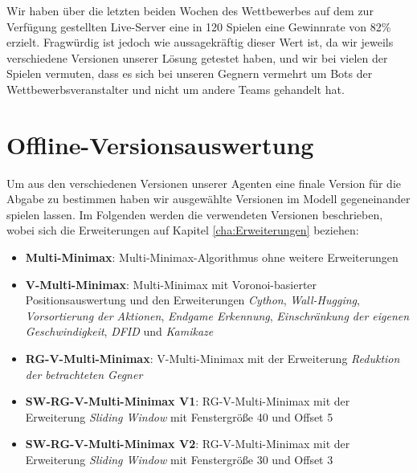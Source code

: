 Wir haben über die letzten beiden Wochen des Wettbewerbes auf dem zur Verfügung gestellten Live-Server eine in 120 Spielen eine Gewinnrate von 82\% erzielt. Fragwürdig ist jedoch wie aussagekräftig dieser Wert ist, da wir jeweils verschiedene Versionen unserer Lösung getestet haben, und wir bei vielen der Spielen vermuten, dass es sich bei unseren Gegnern vermehrt um Bots der Wettbewerbsveranstalter und nicht um andere Teams gehandelt hat.  


\section{Offline-Versionsauswertung}

Um aus den verschiedenen Versionen unserer Agenten eine finale Version für die Abgabe zu bestimmen haben wir ausgewählte Versionen im Modell gegeneinander spielen lassen. Im Folgenden werden die verwendeten Versionen beschrieben, wobei sich die Erweiterungen auf Kapitel \ref{cha:Erweiterungen} beziehen:
\begin{itemize}
    \item \textbf{Multi-Minimax}: Multi-Minimax-Algorithmus \cite{Perez.2019} ohne weitere Erweiterungen
    \item \textbf{V-Multi-Minimax}: Multi-Minimax mit Voronoi-basierter Positionsauswertung und den Erweiterungen \textit{Cython}, \textit{Wall-Hugging}, \textit{Vorsortierung der Aktionen}, \textit{Endgame Erkennung}, \textit{Einschränkung der eigenen Geschwindigkeit}, \textit{\acrshort{DFID}} und \textit{Kamikaze}
    \item \textbf{RG-V-Multi-Minimax}: V-Multi-Minimax mit der Erweiterung \textit{Reduktion der betrachteten Gegner}
     \item \textbf{SW-RG-V-Multi-Minimax V1}: RG-V-Multi-Minimax mit der Erweiterung \textit{Sliding Window} mit Fenstergröße 40 und Offset 5
    \item \textbf{SW-RG-V-Multi-Minimax V2}: RG-V-Multi-Minimax mit der Erweiterung \textit{Sliding Window} mit Fenstergröße 30 und Offset 3
\end{itemize}

